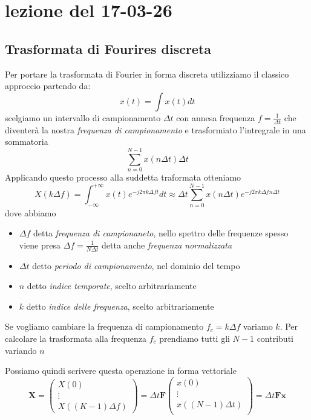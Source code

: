 \documentclass[11pt,a4paper]{article}
\begin{document}
\section{lezione del 17-03-26}
\subsection{Trasformata di Fourires discreta}\label{sub:Trasformata di Fourires discreta} %
Per portare la trasformata di Fourier in forma discreta utilizziamo il classico approccio
partendo da:
\[
   x(t) = \int x(t)dt 
\]
scelgiamo un intervallo di campionamento $ \Delta t $ con annesa frequenza 
$f = \frac{1}{\Delta t}$ che diventerà la nostra \textit{frequenza di campionamento}
e trasformiato l'intregrale in una sommatoria
\[
    \sum_{n = 0}^{N-1}x(n\Delta t)\Delta t
\]
Applicando questo processo alla suddetta traformata otteniamo
\[
    X(k\Delta f) = \int_{- \infty}^{+\infty} x(t)e^{- j 2 \pi k \Delta f t} dt \approx \Delta t \sum_{n = 0}^{N - 1} x(n\Delta t)e^{- j 2 \pi k \Delta f n \Delta t}
\]
dove abbiamo 
\begin{itemize}
    \item $\Delta f$ detta \textit{frequenza di campionaneto}, nello spettro delle frequenze 
        spesso viene presa $\Delta f = \frac{1}{N \Delta t}$ detta anche \textit{frequenza normalizzata}
    \item $\Delta t$ detto \textit{periodo di campionamento}, nel dominio del tempo
    \item $n$ detto \textit{indice temporate}, scelto arbitrariamente
    \item $k$ detto \textit{indice delle frequenza}, scelto arbitrariamente
\end{itemize}

Se vogliamo cambiare la frequenza di campionamento $f_c = k\Delta f$ variamo $k$. 
Per calcolare la trasformata alla frequenza $f_c$ prendiamo tutti gli $N - 1$ contributi variando $n$ 

Possiamo quindi scrivere questa operazione in forma vettoriale
\[
\mathbf{X} =
\begin{pmatrix}
X\left( 0 \right) \\
\vdots \\
X\left( (K - 1) \Delta f \right)
\end{pmatrix} =
\Delta t \mathbf{F}
\begin{pmatrix}
x \left( 0 \right) \\
\vdots \\
x \left( (N - 1) \Delta t \right) \\
\end{pmatrix} =
\Delta t \mathbf{F} \mathbf{x}
\]
\end{document}
